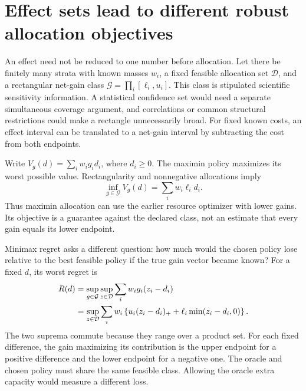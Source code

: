 \section{Effect sets lead to different robust allocation objectives}
\label{exec17:s4-robust-allocation}

An effect need not be reduced to one number before allocation. Let there
be finitely many strata with known masses $w_i$, a fixed feasible allocation
set $\mathcal D$, and a rectangular net-gain class
$\mathcal G=\prod_i[\ell_i,u_i]$. This class is stipulated scientific
sensitivity information. A statistical confidence set would need a separate
simultaneous coverage argument, and correlations or common structural
restrictions could make a rectangle unnecessarily broad. For fixed known
costs, an effect interval can be translated to a net-gain interval by
subtracting the cost from both endpoints.

Write $V_g(d)=\sum_iw_i g_i d_i$, where $d_i\geq0$. The maximin policy
maximizes its worst possible value. Rectangularity and nonnegative
allocations imply
\begin{equation}
 \inf_{g\in\mathcal G}V_g(d)=\sum_iw_i\ell_i d_i.
 \label{exec17:s4-maximin}
\end{equation}
Thus maximin allocation can use the earlier resource optimizer with lower
gains. Its objective is a guarantee against the declared class, not an
estimate that every gain equals its lower endpoint.

Minimax regret asks a different question: how much would the chosen policy
lose relative to the best feasible policy if the true gain vector became
known? For a fixed $d$, its worst regret is
\begin{align}
 R(d)&=\sup_{g\in\mathcal G}\sup_{z\in\mathcal D}
                   \sum_iw_i g_i(z_i-d_i)\notag\\
 &=\sup_{z\in\mathcal D}\sum_iw_i\left\{
       u_i(z_i-d_i)_+ +\ell_i\min(z_i-d_i,0)\right\}.
 \label{exec17:s4-robust-regret}
\end{align}
The two suprema commute because they range over a product set. For each
fixed difference, the gain maximizing its contribution is the upper endpoint
for a positive difference and the lower endpoint for a negative one. The
oracle and chosen policy must share the same feasible class. Allowing the
oracle extra capacity would measure a different loss.

